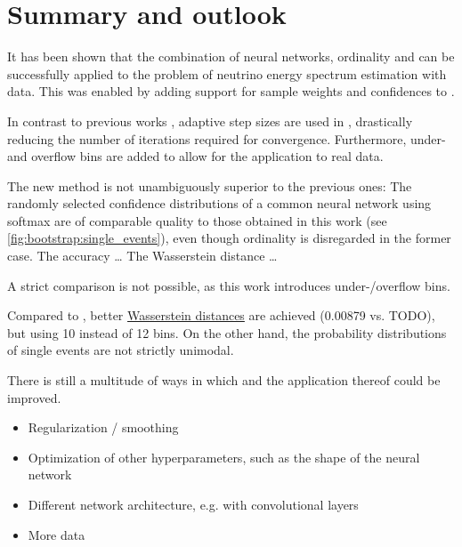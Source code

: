 \chapter{Summary and outlook} \label{sec:summary}

It has been shown that
the combination of neural networks, ordinality and \dsea{}
  can be successfully applied to
  the problem of neutrino energy spectrum estimation
  with \icecube{} data.
This was enabled by
  adding support for
    sample weights
    and confidences
  to \corn{}.

In contrast to previous works \cite{dsea_jan, dsea_samuel},
  adaptive step sizes \cite{dsea_mirko} are used in \dsea{},
    drastically reducing the number of iterations required for convergence.
Furthermore,
  under- and overflow bins are added
    to allow for the application to real data.

The new method is not unambiguously superior to the previous ones:
  The randomly selected confidence distributions of a common neural network using softmax \cite{dsea_samuel}
    are of comparable quality to those obtained in this work (see \autoref{fig:bootstrap:single_events}),
      even though ordinality is disregarded in the former case.
%
The accuracy …
The Wasserstein distance …

A strict comparison is not possible,
  as this work introduces under-/overflow bins.

Compared to \cite{dsea_jan},
  better \hyperref[sec:unfolding:metrics:wd]{Wasserstein distances} are achieved
    (\num{0.00879} vs. TODO),
    but using \num{10} instead of \num{12} bins.
On the other hand,
the probability distributions of single events are not strictly unimodal.


There is still a multitude of ways in which \dsea{} and the application thereof could be improved.
\begin{itemize}
  \item Regularization / smoothing
  \item Optimization of other hyperparameters, such as the shape of the neural network
  \item Different network architecture, e.g. with convolutional layers
  \item More data
\end{itemize}

